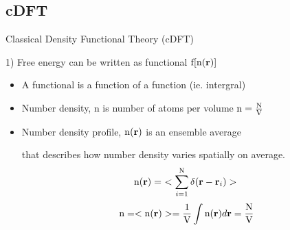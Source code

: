 \documentclass{beamer}
\renewcommand{\vec}[1]{\mathbf{#1}}
\begin{document}
\subsection*{cDFT}
\begin{frame}{Classical Density Functional Theory (cDFT)}
    \begin{block}{1) Free energy can be written as functional $\text f[\text{n}(\vec r)]$}  
       \begin{itemize}
          \item A functional is a function of a function (ie. intergral)
          \item Number density, n is number of atoms per volume $\text n=\frac{\text N}{\text V}$
          \item Number density profile, $\text n(\vec{r})$ is an ensemble average
          
           that describes how number density varies spatially on average. 
          \begin{displaymath}\text n(\vec r)=~<\sum_{i=1}^{\text N}\delta(\vec r - \vec r_i)>~\end{displaymath} 
          \begin{displaymath} \text n=<\text n(\vec{r})>=\frac{1}{\text V}\int{\text n(\vec{r})}{d\vec{r}}=\frac{\text N}{\text V}\end{displaymath}

        \end{itemize}
    \end{block}
\end{frame}  
  
\end{document}
